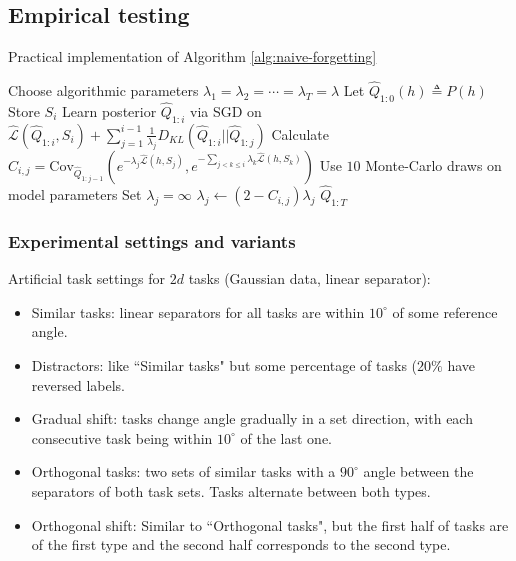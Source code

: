 \documentclass[letterpaper]{article}
\theoremstyle{definition}
\begin{document}
\subsection{Empirical testing}

\begin{algorithm}[H]
	\caption{Practical implementation of Algorithm \ref{alg:naive-forgetting}}
	\label{alg:empirical-forgetting}
	\small
	\begin{algorithmic}[1]
		\State Choose algorithmic parameters $\lambda_1 = \lambda_2 = \cdots = \lambda_T=\lambda$
		\State Let $\hat{Q}_{1:0}(h) \triangleq P(h)$
		\State Store $S_i$
            \State Learn posterior $\hat{Q}_{1:i}$ via SGD on $\hat{\mathcal{L}}(\hat{Q}_{1:i}, S_i)+\sum_{j=1}^{i-1}\frac{1}{\lambda_j}D_{KL}(\hat{Q}_{1:i}||\hat{Q}_{1:j})$
		\State Calculate $C_{i,j}=\textrm{Cov}_{\hat{Q}_{1:j-1}}(e^{-\lambda_j \hat{\mathcal{L}}(h,S_j)}, e^{-\sum_{j< k\leq i}\lambda_k \hat{\mathcal{L}}(h,S_k)})$
             \Comment  Use $10$ Monte-Carlo draws on model parameters
             
                \State Set $\lambda_j=\infty$ 
                 
                    \State $\lambda_j \leftarrow (2-C_{i,j})\lambda_j$ 
                \EndIf
		\EndFor 
		\EndFor
		\State \Return $\hat{Q}_{1:T}$
		\EndFunction
	\end{algorithmic}
\end{algorithm}

\subsubsection{Experimental settings and variants}

Artificial task settings for $2d$ tasks (Gaussian data, linear separator):
\begin{itemize}
    \item Similar tasks: linear separators for all tasks are within $10^\circ$ of some reference angle.
    \item Distractors: like ``Similar tasks" but some percentage of tasks ($20\%$ have reversed labels.
    \item Gradual shift: tasks change angle gradually in a set direction, with each consecutive task being within $10^\circ$ of the last one.
    \item Orthogonal tasks: two sets of similar tasks with a $90^\circ$ angle between the separators of both task sets. Tasks alternate between both types.
    \item Orthogonal shift: Similar to ``Orthogonal tasks", but the first half of tasks are of the first type and the second half corresponds to the second type.
\end{itemize}
\end{document}
